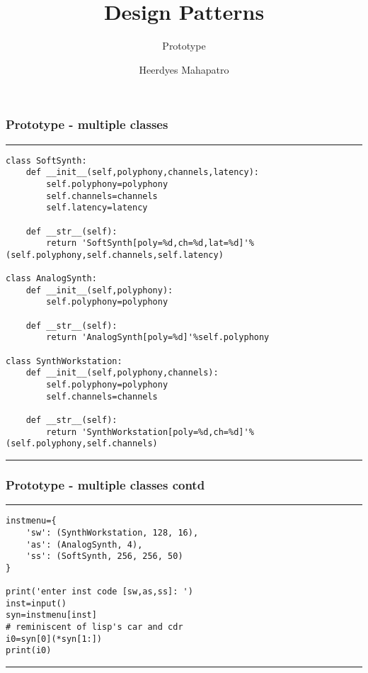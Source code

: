\documentclass{beamer}
\title{Design Patterns}
\subtitle{Prototype}
\author{Heerdyes Mahapatro}
\begin{document}
	\frame {
		\titlepage
	}
	\begin{frame}[fragile]
	    \frametitle{Prototype - multiple classes}
	    \rule{\textwidth}{1pt}
	    \scriptsize
	    \begin{verbatim}
class SoftSynth:
    def __init__(self,polyphony,channels,latency):
        self.polyphony=polyphony
        self.channels=channels
        self.latency=latency
        
    def __str__(self):
        return 'SoftSynth[poly=%d,ch=%d,lat=%d]'%(self.polyphony,self.channels,self.latency)

class AnalogSynth:
    def __init__(self,polyphony):
        self.polyphony=polyphony
    
    def __str__(self):
        return 'AnalogSynth[poly=%d]'%self.polyphony

class SynthWorkstation:
    def __init__(self,polyphony,channels):
        self.polyphony=polyphony
        self.channels=channels
        
    def __str__(self):
        return 'SynthWorkstation[poly=%d,ch=%d]'%(self.polyphony,self.channels)
	    \end{verbatim}
	    \rule{\textwidth}{1pt}
	\end{frame}
	\begin{frame}[fragile]
	    \frametitle{Prototype - multiple classes contd}
	    \rule{\textwidth}{1pt}
	    \scriptsize
	    \begin{verbatim}
instmenu={
    'sw': (SynthWorkstation, 128, 16),
    'as': (AnalogSynth, 4),
    'ss': (SoftSynth, 256, 256, 50)
}

print('enter inst code [sw,as,ss]: ')
inst=input()
syn=instmenu[inst]
# reminiscent of lisp's car and cdr
i0=syn[0](*syn[1:])
print(i0)
	    \end{verbatim}
	    \rule{\textwidth}{1pt}
	\end{frame}
\end{document}

